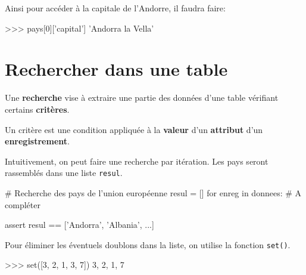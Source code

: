 \medskip

Ainsi pour accéder à la capitale de l'Andorre, il faudra faire:
	
\begin{CodePythontexAlt}[Largeur=1\linewidth,Centre,PremLigne=1, lineNumbers=false]{}
>>> pays[0]['capital']
'Andorra la Vella'
\end{CodePythontexAlt}

\pagebreak

\section{Rechercher dans une table}

\begin{definition}{}
Une \textbf{recherche} vise à extraire une partie des données d'une table vérifiant certains \textbf{critères}.

Un critère est une condition appliquée à la \textbf{valeur} d'un \textbf{attribut} d'un \textbf{enregistrement}.

\end{definition}


\begin{exercice_cours}{}

	Intuitivement, on peut faire une recherche par itération. Les pays seront rassemblés dans une liste \verb+resul+.

\begin{CodePythontexAlt}[Largeur=1\linewidth,Centre,PremLigne=1, lineNumbers=false]{}
# Recherche des pays de l'union européenne
resul = []
for enreg in donnees:
	# A compléter
	
	



assert resul == ['Andorra', 'Albania', ...]
\end{CodePythontexAlt}

\end{exercice_cours}

\begin{exercice_cours}{}


	\end{exercice_cours}


	\begin{remarque}{}
		Pour éliminer les éventuels doublons dans la liste, on utilise la fonction \verb+set()+.
	
	
\begin{CodePythontexAlt}[Largeur=1\linewidth,Centre,PremLigne=1, lineNumbers=false]{}
>>> set([3, 2, 1, 3, 7])
{3, 2, 1, 7}
\end{CodePythontexAlt}
	\end{remarque}


